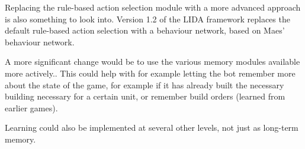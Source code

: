 Replacing the rule-based action selection module with a more advanced approach is also something to look into. Version 1.2 of the LIDA framework replaces the default rule-based action selection with a behaviour network, based on Maes' behaviour network.\cite{maes1989right}

A more significant change would be to use the various memory modules available more actively.\cite{franklin2007lida}. This could help with for example letting the bot remember more about the state of the game, for example if it has already built the necessary building necessary for a certain unit, or remember build orders (learned from earlier games).

Learning could also be implemented at several other levels, not just as long-term memory.
